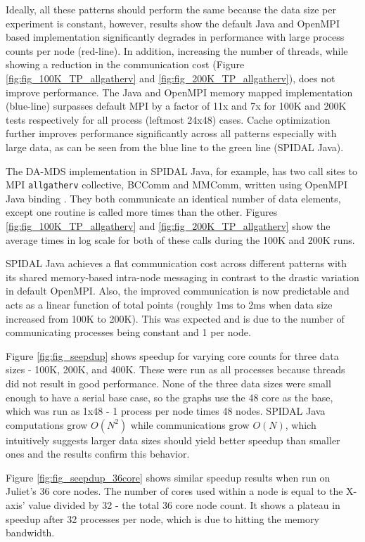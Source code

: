 Ideally, all these patterns should perform the same because the data size per experiment is constant, however, results show the default Java and OpenMPI based implementation significantly degrades in performance with large process counts per node (red-line). In addition, increasing the number of threads, while showing a reduction in the communication cost (Figure \ref{fig:fig_100K_TP_allgatherv} and \ref{fig:fig_200K_TP_allgatherv}), does not improve performance. The Java and OpenMPI memory mapped implementation (blue-line) surpasses default MPI by a factor of 11x and 7x for 100K and 200K tests respectively for all process (leftmost 24x48) cases. Cache optimization further improves performance significantly across all patterns especially with large data, as can be seen from the blue line to the green line (SPIDAL Java).

The DA-MDS implementation in SPIDAL Java, for example, has two call sites to MPI \texttt{allgatherv} collective, BCComm and MMComm, written using OpenMPI Java binding \cite{Vega-Gisbert:2013:TAJ:2488551.2488599}. They both communicate an identical number of data elements, except one routine is called more times than the other. Figures \ref{fig:fig_100K_TP_allgatherv} and \ref{fig:fig_200K_TP_allgatherv} show the average times in log scale for both of these calls during the 100K and 200K runs. 

SPIDAL Java achieves a flat communication cost across different patterns with its shared memory-based intra-node messaging in contrast to the drastic variation in default OpenMPI. Also, the improved communication is now predictable and acts as a linear function of total points (roughly 1ms to 2ms when data size increased from 100K to 200K). This was expected and is due to the number of communicating processes being constant and 1 per node.

Figure \ref{fig:fig_seepdup} shows speedup for varying core counts for three data sizes - 100K, 200K, and 400K. These were run as all processes because threads did not result in good performance. None of the three data sizes were small enough to have a serial base case, so the graphs use the 48 core as the base, which was run as 1x48 - 1 process per node times 48 nodes. SPIDAL Java computations grow $O(N^2)$ while communications grow $O(N)$, which intuitively suggests larger data sizes should yield better speedup than smaller ones and the results confirm this behavior. 

Figure \ref{fig:fig_seepdup_36core} shows similar speedup results when run on Juliet's 36 core nodes. The number of cores used within a node is equal to the X-axis' value divided by 32 - the total 36 core node count. It shows a plateau in speedup after 32 processes per node, which is due to hitting the memory bandwidth. 

